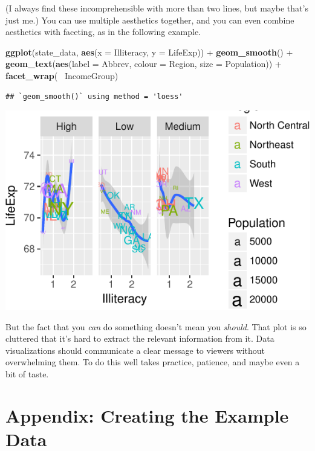 \documentclass[12pt,oneside,openany]{book}
\newenvironment{Shaded}{\begin{snugshade}}{\end{snugshade}}
\newcommand{\KeywordTok}[1]{\textcolor[rgb]{0.13,0.29,0.53}{\textbf{{#1}}}}
\newcommand{\DataTypeTok}[1]{\textcolor[rgb]{0.13,0.29,0.53}{{#1}}}
\newcommand{\StringTok}[1]{\textcolor[rgb]{0.31,0.60,0.02}{{#1}}}
\newcommand{\NormalTok}[1]{{#1}}
\begin{document}
(I always find these incomprehensible with more than two lines, but
maybe that's just me.) You can use multiple aesthetics together, and you
can even combine aesthetics with faceting, as in the following example.

\begin{Shaded}
\begin{Highlighting}[]
\KeywordTok{ggplot}\NormalTok{(state_data, }\KeywordTok{aes}\NormalTok{(}\DataTypeTok{x =} \NormalTok{Illiteracy, }\DataTypeTok{y =} \NormalTok{LifeExp)) +}
\StringTok{  }\KeywordTok{geom_smooth}\NormalTok{() +}
\StringTok{  }\KeywordTok{geom_text}\NormalTok{(}\KeywordTok{aes}\NormalTok{(}\DataTypeTok{label =} \NormalTok{Abbrev, }\DataTypeTok{colour =} \NormalTok{Region, }\DataTypeTok{size =} \NormalTok{Population)) +}
\StringTok{  }\KeywordTok{facet_wrap}\NormalTok{(~}\StringTok{ }\NormalTok{IncomeGroup)}
\end{Highlighting}
\end{Shaded}

\begin{verbatim}
## `geom_smooth()` using method = 'loess'
\end{verbatim}

\includegraphics{pdaps_files/figure-latex/too-many-things-1.pdf}

But the fact that you \emph{can} do something doesn't mean you
\emph{should}. That plot is so cluttered that it's hard to extract the
relevant information from it. Data visualizations should communicate a
clear message to viewers without overwhelming them. To do this well
takes practice, patience, and maybe even a bit of taste.

\section{Appendix: Creating the Example
Data}\label{appendix-creating-the-example-data-1}
\end{document}
